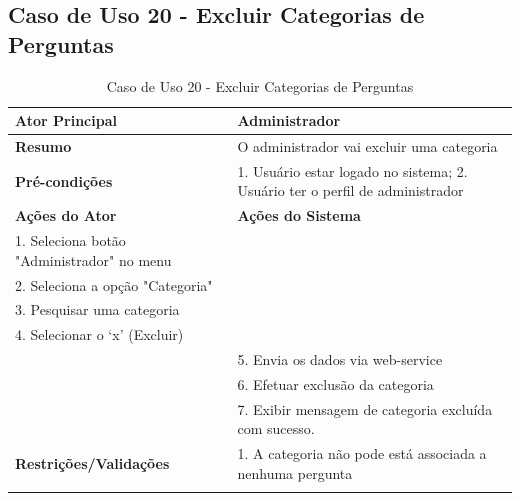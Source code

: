 \subsection{Caso de Uso 20 - Excluir Categorias de Perguntas}
\label{sc:case20}
\begin{center}
\begin{longtable}{p{8cm}|p{8cm}}
    \hline
    \textbf{Ator Principal} & Administrador \\
    \hline
    \textbf{Resumo} & O administrador vai excluir uma categoria \\
    \hline
    \textbf{Pr\'{e}-condi\c{c}\~{o}es} & 1. Usuário estar logado no sistema; 2. Usuário ter o perfil de administrador \\
    \hline
    \textbf{A\c{c}\~{o}es do Ator} & \textbf{A\c{c}\~{o}es do Sistema} \\
    \hline
    1. Seleciona botão "Administrador" no menu \\
    \hline
    2. Seleciona a opção "Categoria" \\
	\hline
    3. Pesquisar uma categoria \\
	\hline
    4. Selecionar o ‘x’ (Excluir) \\
    \hline
    & 5. Envia os dados via web-service \\
	\hline
    & 6. Efetuar exclusão da categoria \\
	\hline
    & 7. Exibir mensagem de categoria excluída com sucesso. \\
    \hline
    \hline
    \textbf{Restri\c{c}\~{o}es/Valida\c{c}\~{o}es} & 1. A categoria não pode está associada a nenhuma pergunta\\
\hline
\caption{Caso de Uso 20 - Excluir Categorias de Perguntas}
\end{longtable}
\end{center}

